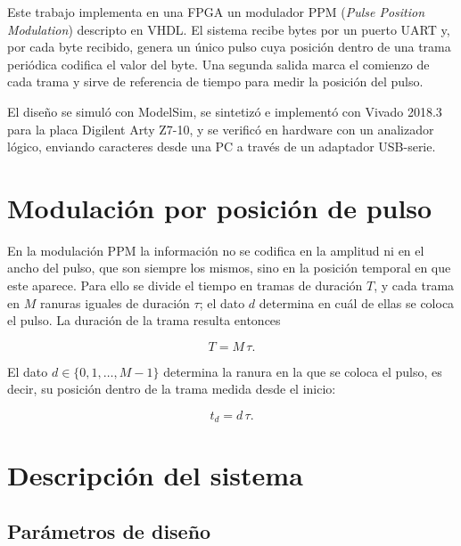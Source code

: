 \documentclass[11pt,a4paper]{article}
\begin{document}
Este trabajo implementa en una FPGA un modulador PPM (\emph{Pulse Position Modulation}) descripto en VHDL.
El sistema recibe bytes por un puerto UART y, por cada byte recibido, genera un único pulso cuya posición
dentro de una trama periódica codifica el valor del byte. Una segunda salida marca el comienzo de cada trama
y sirve de referencia de tiempo para medir la posición del pulso.

El diseño se simuló con ModelSim, se sintetizó e implementó con Vivado 2018.3 para la placa Digilent
Arty Z7-10, y se verificó en hardware con un analizador lógico, enviando caracteres desde una PC a través de
un adaptador USB-serie.

\section{Modulación por posición de pulso}

En la modulación PPM la información no se codifica en la amplitud ni en el ancho del pulso, que son siempre los mismos, sino en la posición temporal en que este aparece. Para ello se divide el tiempo en tramas de duración $T$, y cada trama en $M$ ranuras iguales de duración $\tau$; el dato $d$ determina en cuál de ellas se coloca el pulso. La duración de la trama resulta entonces

\begin{equation}
  T = M\,\tau .
\end{equation}

El dato $d \in \{0, 1, \dots, M-1\}$ determina la ranura en la que se coloca el pulso, es decir, su posición dentro de la trama medida desde el inicio:

\begin{equation}
  t_d = d\,\tau .
\end{equation}


\section{Descripción del sistema}

\subsection{Parámetros de diseño}
\end{document}
